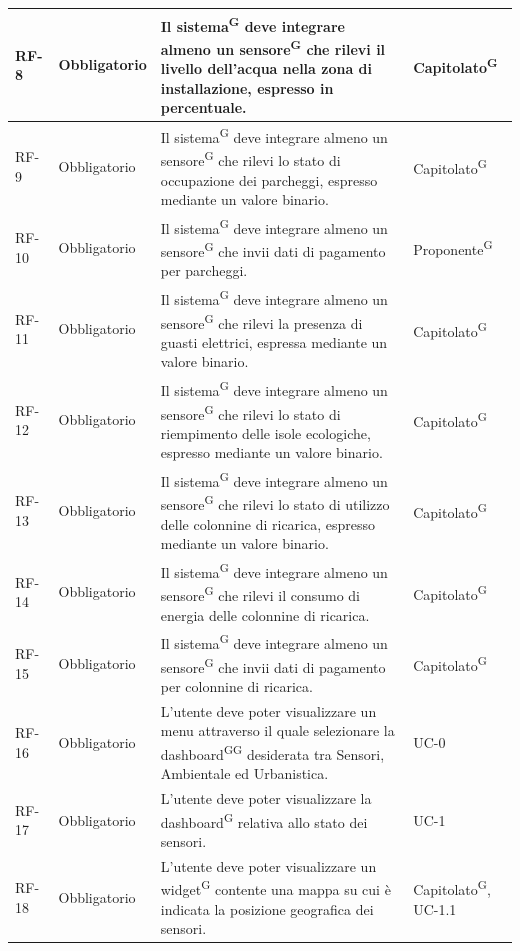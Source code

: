 \documentclass[8pt]{article}
\newcommand{\glossterm}[1]{#1\textsuperscript{G}} %
\begin{document}
\begin{longtable}{|>{\centering\arraybackslash}p{1.2cm}|>{\centering\arraybackslash}p{2cm}|>{\centering\arraybackslash}p{8.5cm}|>{\centering\arraybackslash}p{3cm}|}
            RF-8 & Obbligatorio & Il \glossterm{sistema} deve integrare almeno un \glossterm{sensore} che rilevi il livello dell'acqua nella zona di installazione, espresso in percentuale. & \glossterm{Capitolato} \\ \hline
            RF-9 & Obbligatorio & Il \glossterm{sistema} deve integrare almeno un \glossterm{sensore} che rilevi lo stato di occupazione dei parcheggi, espresso mediante un valore binario. & \glossterm{Capitolato} \\ \hline    
            RF-10 & Obbligatorio & Il \glossterm{sistema} deve integrare almeno un \glossterm{sensore} che invii dati di pagamento per parcheggi. & \glossterm{Proponente} \\ \hline
            RF-11 & Obbligatorio & Il \glossterm{sistema} deve integrare almeno un \glossterm{sensore} che rilevi la presenza di guasti elettrici, espressa mediante un valore binario. & \glossterm{Capitolato} \\ \hline
            RF-12 & Obbligatorio & Il \glossterm{sistema} deve integrare almeno un \glossterm{sensore} che rilevi lo stato di riempimento delle isole ecologiche, espresso mediante un valore binario. & \glossterm{Capitolato} \\ \hline
            RF-13 & Obbligatorio & Il \glossterm{sistema} deve integrare almeno un \glossterm{sensore} che rilevi lo stato di utilizzo delle colonnine di ricarica, espresso mediante un valore binario. & \glossterm{Capitolato} \\ \hline
            RF-14 & Obbligatorio & Il \glossterm{sistema} deve integrare almeno un \glossterm{sensore} che rilevi il consumo di energia delle colonnine di ricarica. & \glossterm{Capitolato} \\ \hline
            RF-15 & Obbligatorio & Il \glossterm{sistema} deve integrare almeno un \glossterm{sensore} che invii dati di pagamento per colonnine di ricarica. & \glossterm{Capitolato} \\ \hline
            RF-16 & Obbligatorio & L'utente deve poter visualizzare un menu attraverso il quale selezionare la \glossterm{\glossterm{dashboard}} desiderata tra Sensori, Ambientale ed Urbanistica. & UC-0 \\ \hline
            RF-17 & Obbligatorio & L'utente deve poter visualizzare la \glossterm{dashboard} relativa allo stato dei sensori. & UC-1 \\ \hline
            RF-18 & Obbligatorio & L'utente deve poter visualizzare un \glossterm{widget} contente una mappa su cui è indicata la posizione geografica dei sensori. & \glossterm{Capitolato}, UC-1.1 \\ \hline

\end{longtable}
\end{document}
